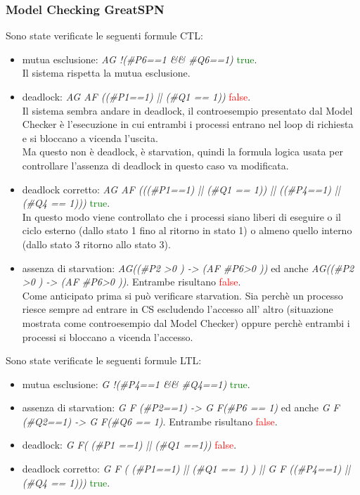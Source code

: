 \documentclass[a4paper]{article}
\begin{document}
\subsubsection{Model Checking GreatSPN}
Sono state verificate le seguenti formule CTL:
\begin{itemize}
	\item mutua esclusione: \textit{AG !(\#P6==1 \&\& \#Q6==1)} \textcolor{green}{true}.\\
		Il sistema rispetta la mutua esclusione.
	\item deadlock: \textit{AG AF ((\#P1==1) || (\#Q1 == 1))} \textcolor{red}{false}.\\
		Il sistema sembra andare in deadlock, il controesempio presentato dal Model Checker è l'esecuzione in cui entrambi i processi entrano nel loop di richiesta e si bloccano a vicenda l'uscita.\\
		Ma questo non è deadlock, è starvation, quindi la formula logica usata per controllare l'assenza di deadlock in questo caso va modificata.
	\item deadlock corretto: \textit{AG AF (((\#P1==1) || (\#Q1 == 1)) || ((\#P4==1) || (\#Q4 == 1)))} \textcolor{green}{true}.\\
		In questo modo viene controllato che i processi siano liberi di eseguire o il ciclo esterno (dallo stato 1 fino al ritorno in stato 1) o almeno quello interno (dallo stato 3 ritorno allo stato 3).
	\item assenza di starvation: \textit{AG((\#P2 >0 ) -> (AF \#P6>0 ))} ed anche \textit{AG((\#P2 >0 ) -> (AF \#P6>0 ))}. Entrambe risultano \textcolor{red}{false}.\\
		Come anticipato prima si può verificare starvation. Sia perchè un processo riesce sempre ad entrare in CS escludendo l'accesso all' altro (situazione mostrata come controesempio dal Model Checker) oppure perchè entrambi i processi si bloccano a vicenda l'accesso.
\end{itemize}
Sono state verificate le seguenti formule LTL:
\begin{itemize}
	\item mutua esclusione: \textit{G !(\#P4==1 \&\& \#Q4==1)} \textcolor{green}{true}.
	\item assenza di starvation: \textit{G F (\#P2==1) -> G F(\#P6 == 1)} ed anche \textit{G F (\#Q2==1) -> G F(\#Q6 == 1)}. Entrambe risultano \textcolor{red}{false}.
	\item deadlock: \textit{G F( (\#P1 ==1) ||  (\#Q1 ==1))} \textcolor{red}{false}.
	\item deadlock corretto: \textit{G F ( (\#P1==1) || (\#Q1 == 1) ) || G F ((\#P4==1) || (\#Q4 == 1)))} \textcolor{green}{true}.\\
\end{itemize}
\newpage
\end{document}

